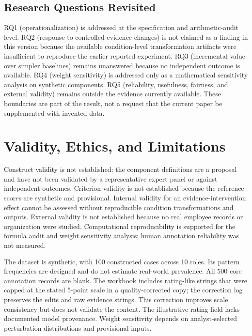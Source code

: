 \documentclass[
  10pt,
  runningheads]{llncs}
\begin{document}
\subsection{Research Questions
Revisited}\label{research-questions-revisited}

RQ1 (operationalization) is addressed at the specification and
arithmetic-audit level. RQ2 (response to controlled evidence changes) is
not claimed as a finding in this version because the available
condition-level transformation artifacts were insufficient to reproduce
the earlier reported experiment. RQ3 (incremental value over simpler
baselines) remains unanswered because no independent outcome is
available. RQ4 (weight sensitivity) is addressed only as a mathematical
sensitivity analysis on synthetic components. RQ5 (reliability,
usefulness, fairness, and external validity) remains outside the
evidence currently available. These boundaries are part of the result,
not a request that the current paper be supplemented with invented data.

\section{Validity, Ethics, and
Limitations}\label{validity-ethics-and-limitations}

Construct validity is not established: the component definitions are a
proposal and have not been validated by a representative expert panel or
against independent outcomes. Criterion validity is not established
because the reference scores are synthetic and provisional. Internal
validity for an evidence-intervention effect cannot be assessed without
reproducible condition transformations and outputs. External validity is
not established because no real employee records or organization were
studied. Computational reproducibility is supported for the formula
audit and weight sensitivity analysis; human annotation reliability was
not measured.

The dataset is synthetic, with 100 constructed cases across 10 roles.
Its pattern frequencies are designed and do not estimate real-world
prevalence. All 500 core annotation records are blank. The workbook
includes rating-like strings that were capped at the stated 5-point
scale in a quality-corrected copy; the correction log preserves the
edits and raw evidence strings. This correction improves scale
consistency but does not validate the content. The illustrative rating
field lacks documented model provenance. Weight sensitivity depends on
analyst-selected perturbation distributions and provisional inputs.
\end{document}
